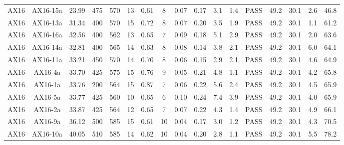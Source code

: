 \documentclass[9pt,twoside,lineno]{pnas-new}
\begin{document}
\begin{table}
\begin{tabular}{ccccccccccccccccc}
AX16 & AX16-15a & 23.99     & 475       & 570       & 13 & 0.61 & 8     & 0.07    & 0.17    & 3.1            & 1.4             & PASS & 49.2       & 30.1          & 2.6      & 46.8          \\
AX16 & AX16-13a & 31.34     & 400       & 570       & 15 & 0.72 & 8     & 0.07    & 0.20    & 3.5            & 1.9             & PASS & 49.2       & 30.1          & 1.1      & 61.2          \\
AX16 & AX16-16a & 32.56     & 400       & 562       & 13 & 0.65 & 7     & 0.09    & 0.18    & 5.1            & 2.9             & PASS & 49.2       & 30.1          & 2.0      & 63.6          \\
AX16 & AX16-14a & 32.81     & 400       & 565       & 14 & 0.63 & 8     & 0.08    & 0.14    & 3.8            & 2.1             & PASS & 49.2       & 30.1          & 6.0      & 64.1          \\
AX16 & AX16-11a & 33.21     & 450       & 570       & 14 & 0.70 & 8     & 0.06    & 0.15    & 2.9            & 2.1             & PASS & 49.2       & 30.1          & 4.6      & 64.9          \\
AX16 & AX16-4a  & 33.70     & 425       & 575       & 15 & 0.76 & 9     & 0.05    & 0.21    & 4.8            & 1.1             & PASS & 49.2       & 30.1          & 4.2      & 65.8          \\
AX16 & AX16-1a  & 33.76     & 200       & 564       & 15 & 0.87 & 7     & 0.06    & 0.22    & 5.6            & 2.4             & PASS & 49.2       & 30.1          & 4.5      & 65.9          \\
AX16 & AX16-5a  & 33.77     & 425       & 560       & 10 & 0.65 & 6     & 0.10    & 0.24    & 7.4            & 3.9             & PASS & 49.2       & 30.1          & 4.0      & 65.9          \\
AX16 & AX16-2a  & 33.87     & 425       & 564       & 12 & 0.65 & 7     & 0.07    & 0.22    & 4.3            & 1.4             & PASS & 49.2       & 30.1          & 4.9      & 66.1          \\
AX16 & AX16-9a  & 36.12     & 500       & 585       & 15 & 0.61 & 10    & 0.04    & 0.17    & 3.0            & 1.2             & PASS & 49.2       & 30.1          & 4.3      & 70.5          \\
AX16 & AX16-10a & 40.05     & 510       & 585       & 14 & 0.62 & 10    & 0.04    & 0.20    & 2.8            & 1.1             & PASS & 49.2       & 30.1          & 5.5      & 78.2         \\
\hline
\end{tabular}
\label{tab:PINT_result}
\end{table}
\end{document}
